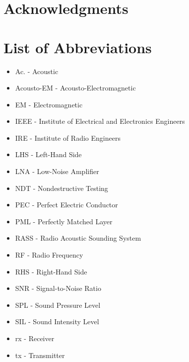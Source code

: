 \documentclass[11pt,twoside]{eitExjobb}
\begin{document}
	\chapter*{Acknowledgments}
	
	\tableofcontents
	\chapter*{List of Abbreviations}
	\begin{itemize}
		\item Ac. - Acoustic
		\item Acousto-EM - Acousto-Electromagnetic
		\item EM - Electromagnetic
		\item IEEE - Institute of Electrical and Electronics Engineers
		\item IRE - Institute of Radio Engineers
		\item LHS - Left-Hand Side
		\item LNA - Low-Noise Amplifier
		\item NDT - Nondestructive Testing
		\item PEC - Perfect Electric Conductor
		\item PML - Perfectly Matched Layer
		\item RASS - Radio Acoustic Sounding System
		\item RF - Radio Frequency
		\item RHS - Right-Hand Side
		\item SNR - Signal-to-Noise Ratio
		\item SPL - Sound Pressure Level
		\item SIL - Sound Intensity Level
		\item rx - Receiver
		\item tx - Transmitter
	\end{itemize}
	
\end{document}
